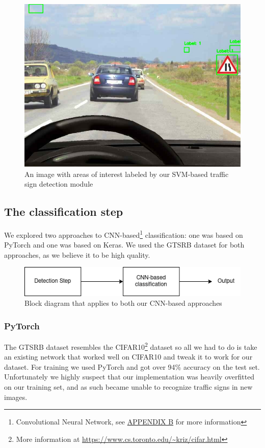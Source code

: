 \documentclass[conference]{IEEEtran}
\begin{document}
\begin{figure}[H]
    \includegraphics[width=\linewidth]{svm-with-labels}
    \centering
    \caption{An image with areas of interest labeled by our SVM-based traffic sign detection module}
\end{figure}

\subsection{The classification step}

We explored two approaches to CNN-based\footnote{Convolutional Neural Network, see \hyperlink{appendix-cnn}{APPENDIX B} for more information} classification: one was based on PyTorch\cite{Paszke_PyTorch_An_Imperative_2019}
and one was based on Keras\cite{chollet2015keras}. We used the GTSRB dataset for both approaches,
as we believe it to be high quality.

\begin{figure}[H]
    \includegraphics[width=\linewidth]{Classification-Diagram}
    \caption{Block diagram that applies to both our CNN-based approaches}
\end{figure}

\subsubsection{PyTorch}
The GTSRB dataset resembles the CIFAR10\footnote{More information at \url{https://www.cs.toronto.edu/~kriz/cifar.html}}
dataset so all we had to do is take an existing network that worked well on CIFAR10
and tweak it to work for our dataset. For training we used PyTorch\cite{Paszke_PyTorch_An_Imperative_2019} and got over
94\% accuracy on the test set. Unfortunately we highly suspect that our implementation
was heavily overfitted on our training set, and as such became unable to recognize traffic signs
in new images.
\end{document}

